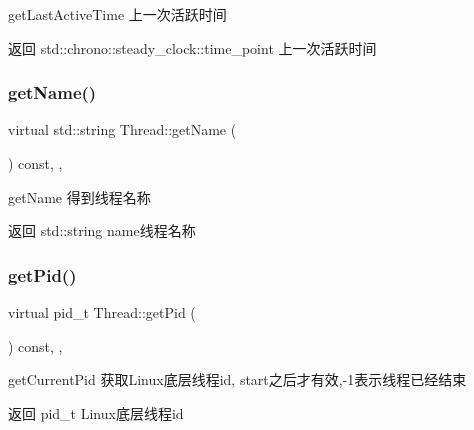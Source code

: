 get\+Last\+Active\+Time 上一次活跃时间 

\begin{DoxyReturn}{返回}
std\+::chrono\+::steady\+\_\+clock\+::time\+\_\+point 上一次活跃时间 
\end{DoxyReturn}
\mbox{\label{classThread_a19bc237f8a86727a5a4b516122fe20f6}} 
\subsubsection{\texorpdfstring{get\+Name()}{getName()}}
{\footnotesize\ttfamily virtual std\+::string Thread\+::get\+Name (\begin{DoxyParamCaption}{ }\end{DoxyParamCaption}) const\hspace{0.3cm}{\ttfamily [inline]}, {\ttfamily [final]}, {\ttfamily [virtual]}}



get\+Name 得到线程名称 

\begin{DoxyReturn}{返回}
std\+::string name线程名称 
\end{DoxyReturn}
\mbox{\label{classThread_ad7fd4dfa0edff93d118b2edf5ab7be2c}} 
\subsubsection{\texorpdfstring{get\+Pid()}{getPid()}}
{\footnotesize\ttfamily virtual pid\+\_\+t Thread\+::get\+Pid (\begin{DoxyParamCaption}{ }\end{DoxyParamCaption}) const\hspace{0.3cm}{\ttfamily [inline]}, {\ttfamily [final]}, {\ttfamily [virtual]}}



get\+Current\+Pid 获取\+Linux底层线程id, start之后才有效,-\/1表示线程已经结束 

\begin{DoxyReturn}{返回}
pid\+\_\+t Linux底层线程id 
\end{DoxyReturn}
\mbox{\label{classThread_a712ab58b9e89f458427b213b1197a666}} 
